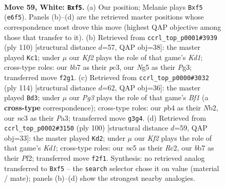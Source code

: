 \documentclass[11pt]{article}
\begin{document}
\clearpage

\begin{figure}[p]\centering
\begin{subfigure}{0.46\textwidth}\centering
\resizebox{\linewidth}{!}{%
\newchessgame
\chessboard[
  setfen={8/Pb4k1/4B3/2n2pN1/1pN2P2/1Pn3P1/5K1P/R7 w - - 3 59},
  showmover=false,
  pgfstyle=straightmove, color=movearrow, markmove={e6-f5}
]}
\caption{}
\end{subfigure}\hfill
\begin{subfigure}{0.46\textwidth}\centering
\resizebox{\linewidth}{!}{%
\newchessgame
\chessboard[
  setfen={8/4k3/1p2b3/p3Np2/Pn1P1P2/2p1P1P1/2B5/3K4 w - - 0 56},
  showmover=false,
  pgfstyle=straightmove, color=movearrow, markmove={d1-c1}
]}
\caption{}
\end{subfigure}
\\[4pt]
\begin{subfigure}{0.46\textwidth}\centering
\resizebox{\linewidth}{!}{%
\newchessgame
\chessboard[
  setfen={8/3k1b2/p2n2pp/2p1B3/2Pn1P2/P7/1N3K1P/5B2 w - - 9 58},
  showmover=false,
  pgfstyle=straightmove, color=movearrow, markmove={f1-d3}
]}
\caption{}
\end{subfigure}\hfill
\begin{subfigure}{0.46\textwidth}\centering
\resizebox{\linewidth}{!}{%
\newchessgame
\chessboard[
  setfen={1r6/3k4/2n2p2/3p1Np1/p2P2P1/P7/1PR2P2/3K4 w - - 16 51},
  showmover=false,
  pgfstyle=straightmove, color=movearrow, markmove={d1-d2}
]}
\caption{}
\end{subfigure}
\caption{\textbf{Move 59, White: \texttt{Bxf5}.} (a) Our position; Melanie plays \texttt{Bxf5} (\texttt{e6f5}). Panels (b)--(d) are the retrieved master positions whose correspondence most drove this move (highest QAP objective among those that transfer to it). (b) Retrieved from \texttt{ccrl\_top\_p0001\#3939} (ply 110) [structural distance $d$=57, QAP obj=38]: the master played \texttt{Kc1}; under $\mu$ our \emph{Kf2} plays the role of that game's \emph{Kd1}; cross-type roles: our \emph{b}b7 as their \emph{p}c3, our \emph{N}g5 as their \emph{P}g3; transferred move \texttt{f2g1}. (c) Retrieved from \texttt{ccrl\_top\_p0000\#3032} (ply 114) [structural distance $d$=62, QAP obj=36]: the master played \texttt{Bd3}; under $\mu$ our \emph{Pg3} plays the role of that game's \emph{Bf1} (a \textbf{cross-type} correspondence); cross-type roles: our \emph{p}b4 as their \emph{N}b2, our \emph{n}c3 as their \emph{P}a3; transferred move \texttt{g3g4}. (d) Retrieved from \texttt{ccrl\_top\_p0002\#3150} (ply 100) [structural distance $d$=59, QAP obj=33]: the master played \texttt{Kd2}; under $\mu$ our \emph{Kf2} plays the role of that game's \emph{Kd1}; cross-type roles: our \emph{n}c5 as their \emph{R}c2, our \emph{b}b7 as their \emph{P}f2; transferred move \texttt{f2f1}. Synthesis: no retrieved analog transferred to \texttt{Bxf5} -- the \texttt{search} selector chose it on value (material / mate); panels (b)--(d) show the strongest nearby analogies.}
\label{fig:thought-m116}
\end{figure}
\end{document}
